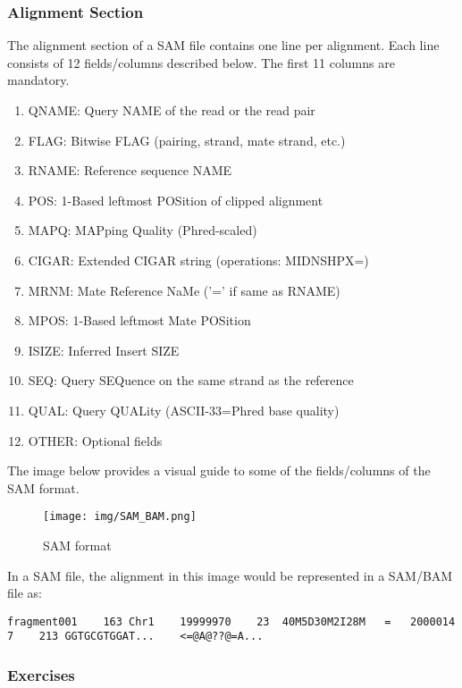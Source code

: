 \documentclass[11pt]{article}
\providecommand{\tightlist}{%
      \setlength{\itemsep}{0pt}\setlength{\parskip}{0pt}}
\begin{document}
    \hypertarget{alignment-section}{%
\subsubsection{Alignment Section}\label{alignment-section}}

The alignment section of a SAM file contains one line per alignment.
Each line consists of 12 fields/columns described below. The first 11
columns are mandatory.

\begin{enumerate}
\def\labelenumi{\arabic{enumi}.}
\tightlist
\item
  QNAME: Query NAME of the read or the read pair
\item
  FLAG: Bitwise FLAG (pairing, strand, mate strand, etc.)
\item
  RNAME: Reference sequence NAME
\item
  POS: 1-Based leftmost POSition of clipped alignment
\item
  MAPQ: MAPping Quality (Phred-scaled)
\item
  CIGAR: Extended CIGAR string (operations: MIDNSHPX=)
\item
  MRNM: Mate Reference NaMe ('=' if same as RNAME)
\item
  MPOS: 1-Based leftmost Mate POSition
\item
  ISIZE: Inferred Insert SIZE
\item
  SEQ: Query SEQuence on the same strand as the reference
\item
  QUAL: Query QUALity (ASCII-33=Phred base quality)
\item
  OTHER: Optional fields
\end{enumerate}

The image below provides a visual guide to some of the fields/columns of
the SAM format.

    \begin{figure}
\centering
\texttt{[image: img/SAM\_BAM.png]}
\caption{SAM format}
\end{figure}

    In a SAM file, the alignment in this image would be represented in a
SAM/BAM file as:

\texttt{fragment001\ \ \ \ 163\ Chr1\ \ \ \ 19999970\ \ \ \ 23\ \ 40M5D30M2I28M\ \ \ =\ \ \ 20000147\ \ \ \ 213\ GGTGCGTGGAT...\ \ \ \ \textless{}=@A@??@=A...}

\hypertarget{exercises}{%
\subsubsection{Exercises}\label{exercises}}
\end{document}
